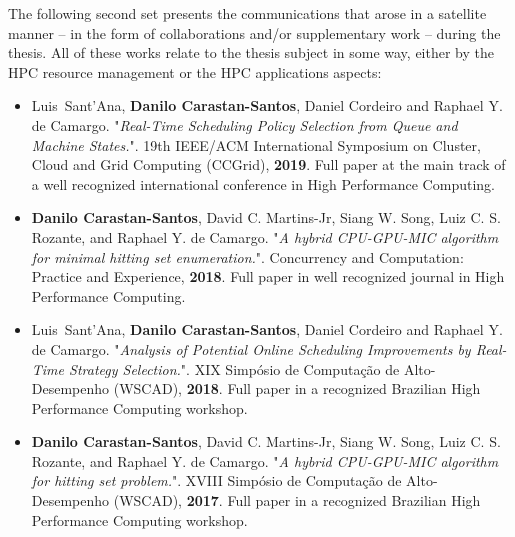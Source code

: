 The following second set presents the communications that arose in a satellite manner -- in the form of collaborations and/or supplementary work -- during the thesis. All of these works relate to the thesis subject in some way, either by the HPC resource management or the HPC applications aspects:

\begin{itemize}
    \item Luis~Sant'Ana, \textbf{Danilo Carastan-Santos}, Daniel Cordeiro and Raphael Y. de Camargo. "\textit{Real-Time Scheduling Policy Selection from Queue and Machine States.}". 19th IEEE/ACM International Symposium on Cluster, Cloud and Grid Computing (CCGrid), \textbf{2019}. Full paper at the main track of a well recognized international conference in High Performance Computing.
    
    \item \textbf{Danilo Carastan-Santos}, David C. Martins-Jr, Siang W. Song, Luiz C. S. Rozante, and Raphael Y. de Camargo. "\textit{A hybrid CPU-GPU-MIC algorithm for minimal hitting set enumeration.}". Concurrency and Computation: Practice and Experience, \textbf{2018}. Full paper in well recognized journal in High Performance Computing.
    
    \item Luis~Sant'Ana, \textbf{Danilo Carastan-Santos}, Daniel Cordeiro and Raphael Y. de Camargo. "\textit{Analysis of Potential Online Scheduling Improvements by Real-Time Strategy Selection.}". XIX Simpósio de Computação de Alto-Desempenho (WSCAD), \textbf{2018}. Full paper in a recognized Brazilian High Performance Computing workshop.
    
    \item \textbf{Danilo Carastan-Santos}, David C. Martins-Jr, Siang W. Song, Luiz C. S. Rozante, and Raphael Y. de Camargo. "\textit{A hybrid CPU-GPU-MIC algorithm for hitting set problem.}". XVIII Simpósio de Computação de Alto-Desempenho (WSCAD), \textbf{2017}. Full paper in a recognized Brazilian High Performance Computing workshop.
\end{itemize}






 
 

